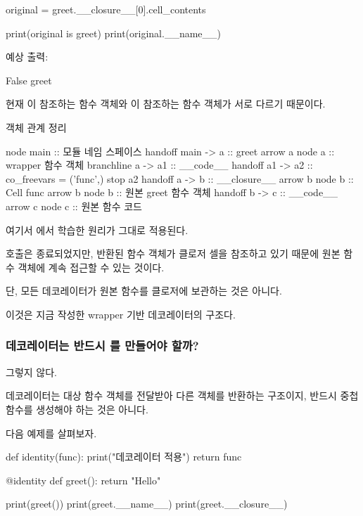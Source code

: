 \begin{dhkcode}
original = greet.__closure__[0].cell_contents

print(original is greet)
print(original.__name__)
\end{dhkcode}

예상 출력:

\begin{dhkzsh}
False
greet
\end{dhkzsh}

현재 이 참조하는 함수 객체와 이 참조하는 함수 객체가 서로 다르기 때문이다.

\begin{dhknote}
\begin{dhksmry}[centered]
객체 관계 정리
\end{dhksmry}
\end{dhknote}

\begin{dhkbranch}[in=8]
node main :: 모듈 네임 스페이스
handoff main -> a :: greet
arrow a
node a :: wrapper 함수 객체
branchline a -> a1 :: __code__
handoff a1 -> a2 :: co_freevars = ('func',)
stop a2
handoff a -> b :: __closure__
arrow b
node b :: Cell func
arrow b
node b :: 원본 greet 함수 객체
handoff b -> c :: __code__
arrow c
node c :: 원본 함수 코드
\end{dhkbranch}

여기서 에서 학습한 원리가 그대로 적용된다.

 호출은 종료되었지만, 반환된  함수 객체가 클로저 셀을 참조하고 있기 때문에 원본 함수 객체에 계속 접근할 수 있는 것이다.

단, 모든 데코레이터가 원본 함수를 클로저에 보관하는 것은 아니다.

이것은 지금 작성한 wrapper 기반 데코레이터의 구조다.

\subsubsection{데코레이터는 반드시 를 만들어야 할까?}

그렇지 않다.

데코레이터는 대상 함수 객체를 전달받아 다른 객체를 반환하는 구조이지, 반드시 중첩 함수를 생성해야 하는 것은 아니다.

다음 예제를 살펴보자.

\begin{dhkcode}
def identity(func):
    print("데코레이터 적용")
    return func


@identity
def greet():
    return "Hello"


print(greet())
print(greet.__name__)
print(greet.__closure__)
\end{dhkcode}

